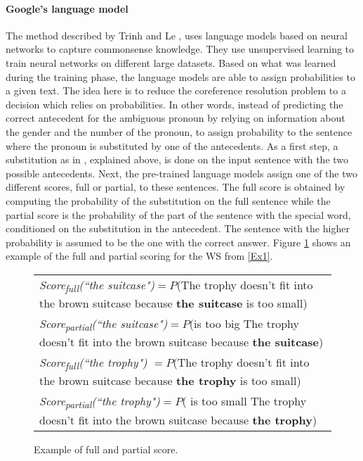 \paragraph{Google’s language model}
The method described by Trinh and Le \cite{DBLP:journals/corr/abs-1806-02847}, uses language models based on neural networks to capture commonsense knowledge. They use unsupervised learning to train neural networks on different large datasets. Based on what was learned during the training phase, the language models are able to assign probabilities to a given text. The idea here is to reduce the coreference resolution problem to a decision which relies on probabilities. In other words, instead of predicting the correct antecedent for the ambiguous pronoun by relying on information about the gender and the number of the pronoun, to assign probability to the sentence where the pronoun is substituted by one of the antecedents. 
As a first step, a substitution as in \cite{W18-4105}, explained above, is done on the input sentence with the two possible antecedents. Next, the pre-trained language models assign one of the two different scores, full or partial, to these sentences. The full score is obtained by computing the probability of the substitution on the full sentence while the partial score is the probability of the part of the sentence with the special word, conditioned on the substitution in the antecedent. The sentence with the higher probability is assumed to be the one with the correct answer. Figure \ref{score} shows an example of the full and partial scoring for the WS from \ref{Ex1}. \\

\begin{figure} [h!]
	\small
	\begin{tabularx}{\textwidth}{X}
		\hline
		\textit{Score\textsubscript{full}(``the suitcase")}$=P$(The trophy doesn't fit into the brown suitcase because \textbf{the suitcase} is too small)\\ 
		\textit{Score\textsubscript{partial}(``the suitcase")}$=P$(is too big \textbar The trophy doesn't fit into the brown suitcase because \textbf{the suitcase})\\ \hline
		\textit{Score\textsubscript{full}(``the trophy") }$=P$(The trophy doesn't fit into the brown suitcase because \textbf{the trophy} is too small)\\ 
		\textit{Score\textsubscript{partial}(``the trophy")}$=P$( is too small \textbar The trophy doesn't fit into the brown suitcase because \textbf{the trophy})\\
		\hline
	\end{tabularx}
	
	\caption{{\label{score}}Example of full and partial score.}
\end{figure}

